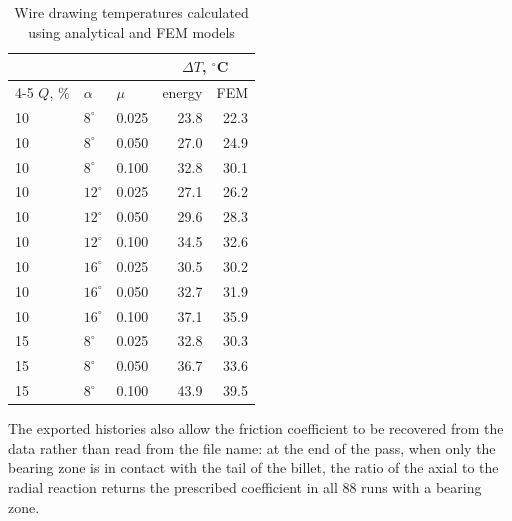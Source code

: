 \begin{table}[htbp]
\centering\small
\caption{Wire drawing temperatures calculated using analytical and FEM models}
\label{tab:deltaT}
\begin{tabular}{@{}lllrr@{}}
\toprule
 & & & \multicolumn{2}{c}{$\Delta T$, $^\circ$C} \\
\cmidrule(l){4-5}
$Q$, \% & $\alpha$ & $\mu$ & energy & FEM \\
\midrule
10 & $8^\circ$  & 0.025 & 23.8 & 22.3 \\
10 & $8^\circ$  & 0.050 & 27.0 & 24.9 \\
10 & $8^\circ$  & 0.100 & 32.8 & 30.1 \\
10 & $12^\circ$ & 0.025 & 27.1 & 26.2 \\
10 & $12^\circ$ & 0.050 & 29.6 & 28.3 \\
10 & $12^\circ$ & 0.100 & 34.5 & 32.6 \\
10 & $16^\circ$ & 0.025 & 30.5 & 30.2 \\
10 & $16^\circ$ & 0.050 & 32.7 & 31.9 \\
10 & $16^\circ$ & 0.100 & 37.1 & 35.9 \\
15 & $8^\circ$  & 0.025 & 32.8 & 30.3 \\
15 & $8^\circ$  & 0.050 & 36.7 & 33.6 \\
15 & $8^\circ$  & 0.100 & 43.9 & 39.5 \\
\bottomrule
\end{tabular}
\end{table}

The exported histories also allow the friction coefficient to be recovered from the data rather
than read from the file name: at the end of the pass, when only the bearing zone is in contact with the
tail of the billet, the ratio of the axial to the radial reaction returns the prescribed
coefficient in all 88 runs with a bearing zone.

